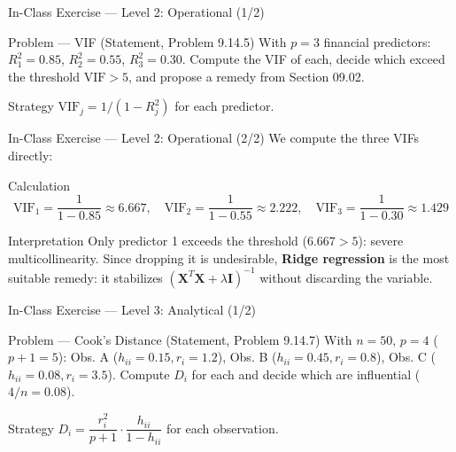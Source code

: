 \documentclass[10pt, aspectratio=169]{beamer}
\begin{document}
\begin{frame}{In-Class Exercise --- Level 2: Operational (1/2)}
  \footnotesize
  \begin{block}{Problem --- VIF (Statement, Problem 9.14.5)}
    With $p=3$ financial predictors: $R_1^2=0.85$, $R_2^2=0.55$, $R_3^2=0.30$. Compute the VIF of each, decide which exceed the threshold $\text{VIF}>5$, and propose a remedy from Section 09.02.
  \end{block}

  \vspace{0.15cm}
  \pause
  \begin{alertblock}{Strategy}
    $\text{VIF}_j=1/(1-R_j^2)$ for each predictor.
  \end{alertblock}
\end{frame}

\begin{frame}{In-Class Exercise --- Level 2: Operational (2/2)}
  \scriptsize
  We compute the three VIFs directly: \pause

  \vspace{0.05cm}
  \begin{block}{Calculation}
    $$\text{VIF}_1=\frac{1}{1-0.85}\approx6.667, \quad \text{VIF}_2=\frac{1}{1-0.55}\approx2.222, \quad \text{VIF}_3=\frac{1}{1-0.30}\approx1.429$$
  \end{block}

  \vspace{0.05cm}
  \pause
  \begin{alertblock}{Interpretation}
    Only predictor 1 exceeds the threshold ($6.667>5$): severe multicollinearity. Since dropping it is undesirable, \textbf{Ridge regression} is the most suitable remedy: it stabilizes $(\mathbf{X}^T\mathbf{X}+\lambda\mathbf{I})^{-1}$ without discarding the variable.
  \end{alertblock}
\end{frame}

\begin{frame}{In-Class Exercise --- Level 3: Analytical (1/2)}
  \footnotesize
  \begin{block}{Problem --- Cook's Distance (Statement, Problem 9.14.7)}
    With $n=50$, $p=4$ ($p+1=5$): Obs. A ($h_{ii}=0.15,r_i=1.2$), Obs. B ($h_{ii}=0.45,r_i=0.8$), Obs. C ($h_{ii}=0.08,r_i=3.5$). Compute $D_i$ for each and decide which are influential ($4/n=0.08$).
  \end{block}

  \vspace{0.1cm}
  \pause
  \begin{alertblock}{Strategy}
    $D_i=\dfrac{r_i^2}{p+1}\cdot\dfrac{h_{ii}}{1-h_{ii}}$ for each observation.
  \end{alertblock}
\end{frame}
\end{document}
